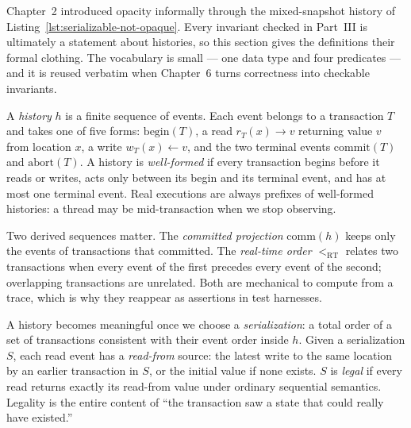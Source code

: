 Chapter~2 introduced opacity informally through the mixed-snapshot history of Listing~\ref{lst:serializable-not-opaque}. Every invariant checked in Part~III is ultimately a statement about histories, so this section gives the definitions their formal clothing. The vocabulary is small --- one data type and four predicates --- and it is reused verbatim when Chapter~6 turns correctness into checkable invariants.

A \emph{history} $h$ is a finite sequence of events. Each event belongs to a transaction $T$ and takes one of five forms: $\mathrm{begin}(T)$, a read $r_T(x)\!\to\!v$ returning value $v$ from location $x$, a write $w_T(x)\!\leftarrow\!v$, and the two terminal events $\mathrm{commit}(T)$ and $\mathrm{abort}(T)$. A history is \emph{well-formed} if every transaction begins before it reads or writes, acts only between its begin and its terminal event, and has at most one terminal event. Real executions are always prefixes of well-formed histories: a thread may be mid-transaction when we stop observing.

Two derived sequences matter. The \emph{committed projection} $\mathrm{comm}(h)$ keeps only the events of transactions that committed. The \emph{real-time order} $<_\mathrm{RT}$ relates two transactions when every event of the first precedes every event of the second; overlapping transactions are unrelated. Both are mechanical to compute from a trace, which is why they reappear as assertions in test harnesses.

A history becomes meaningful once we choose a \emph{serialization}: a total order of a set of transactions consistent with their event order inside $h$. Given a serialization $S$, each read event has a \emph{read-from} source: the latest write to the same location by an earlier transaction in $S$, or the initial value if none exists. $S$ is \emph{legal} if every read returns exactly its read-from value under ordinary sequential semantics. Legality is the entire content of ``the transaction saw a state that could really have existed.''

